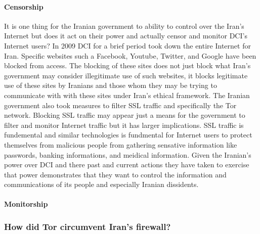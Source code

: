 \documentclass[11pt]{article}
\begin{document}
\begin{multicols}{2}
\paragraph{Censorship} 

It is one thing for the Iranian government to ability to control over the Iran's
Internet but does it act on their power and actually censor and monitor DCI's
Internet users? In 2009 DCI for a brief period took down the entire Internet for
Iran. \cite{FindingWayAroundIranianCensorship} Specific websites such a
Facebook, Youtube, Twitter, and Google have been blocked from access.
\cite{FindingWayAroundIranianCensorship, IransElectronicCurtain} The blocking of
these sites does not just block what Iran's government may consider illegitimate
use of such websites, it  blocks legitimate use of these sites by Iranians and
those whom they may be trying to communicate with with these sites under Iran's
ethical framework. The Iranian government also took measures to filter SSL
traffic and specifically the Tor network.  \cite{Tor:IranPartiallyBlocksSSL,
IranBlocksTorSameDayFix} Blocking SSL traffic may appear just a means for the
government to filter and monitor Internet traffic but it has larger
implications. SSL traffic is fundemental and similar technologies is fundmental
for Internet users to protect themselves from malicious people from gathering
sensative information like passwords, banking informations, and meidical
information. Given the Iranian's power over DCI and there past and current
actions they have taken to exercise that power demonstrates that they want to
control the information and communications of its people and especially Iranian
dissidents.

\paragraph{Monitorship}



\subsubsection{How did Tor circumvent Iran's firewall?}


\end{multicols}
\end{document}
